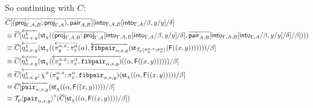 \documentclass[10pt]{article}
\theoremstyle{definition}
\newcommand{\rewrite}[2]{\overleftarrow{#1}(#2)}
\newcommand\St[2]{\ensuremath{{#1}^*(#2)}}
\newcommand\StI[2]{\ensuremath{\mathsf{st}_{#1}(#2)}}
\newcommand\FI[1]{\ensuremath{\mathsf{F}{(#1)}}}
\newcommand\TrPlus[2]{\ensuremath{{#1}^+(#2)}}
\newcommand\ApEl[2]{\mathcal{T}_{#1}\langle#2\rangle}
\begin{document}
\begin{enumerate}[style = multiline, labelwidth = 80pt]
\begin{align*}
\end{align*}
So continuing with $C$:
\begin{align*}
&\upstairs{C[(\proj{\Gamma, A, B};\proj{\Gamma, A}), \qpair{A,B}]}[\into{\Gamma, A, B}[\into{\Gamma, A}/\beta, y/y] /\delta] \\
&\equiv \upstairs{C}[\rewrite{\eta^\chi_{\alpha.x.y}}{\StI{\chi}{(\upstairs{\proj{\Gamma, A, B};\proj{\Gamma, A}}[\into{\Gamma, A, B}[\into{\Gamma, A}/\beta, y/y] /\delta], \upstairs{\qpair{A,B}}[\into{\Gamma, A, B}[\into{\Gamma, A}/\beta, y/y] /\delta]/\beta])}} \\
&\equiv \upstairs{C}[\rewrite{\eta^\chi_{\alpha.x.y}}{\StI{\chi}{(\rewrite{\pi^{\alpha.x}_y;\pi^\alpha_x}{\alpha}, \rewrite{\fibpair{\alpha,x,y}}{\StI{\ApEl{p}{\pi^{\alpha.x}_y;\pi^{\alpha}_x}}{\FI{(x, y)}}})}}/\beta] \\
&\equiv \upstairs{C}[\rewrite{\eta^\chi_{\alpha.x.y}}{\StI{\chi}{\rewrite{(\pi^{\alpha.x}_y;\pi^\alpha_x, \fibpair{\alpha,x,y})}{(\alpha, \FI{(x, y)})}}}/\beta] \\
&\equiv \upstairs{C}[\rewrite{\eta^\chi_{\alpha.x.y};\TrPlus{\chi}{\pi^{\alpha.x}_y;\pi^\alpha_x, \fibpair{\alpha,x,y}}}{\StI{\chi}{(\alpha, \FI{(x, y)})}}/\beta] \\
&\equiv \upstairs{C}[\rewrite{\pair{\alpha,x,y}}{\StI{\chi}{(\alpha, \FI{(x, y)})}}/\beta] \\
&\equiv \St{\ApEl{p}{\pair{\alpha,x,y}}}{\upstairs{C}[\StI{\chi}{(\alpha, \FI{(x, y)})}/\beta]} \\
\end{align*}


\end{enumerate}
\end{document}
